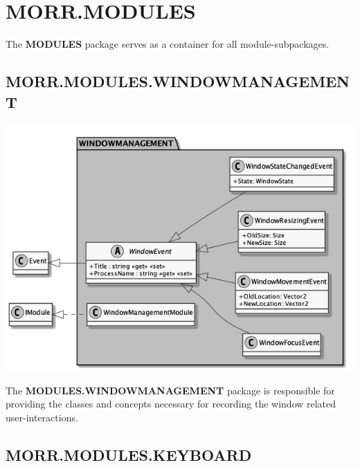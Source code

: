 \newpage
\section{MORR.MODULES}

The \textbf{MODULES} package serves as a container for all module-subpackages.

\begin{packpack}
\end{packpack}

\subsection*{MORR.MODULES.WINDOWMANAGEMENT}

\begin{center}
    \includegraphics[width=1.0\textwidth]{resources/Packages/MODULES_WINDOWMANAGEMENT.png}
\end{center}

The \textbf{MODULES.WINDOWMANAGEMENT} package is responsible for providing the classes and concepts necessary for recording the window related user-interactions.

\begin{packclass}
\end{packclass}
\newpage
\subsection*{MORR.MODULES.KEYBOARD}

